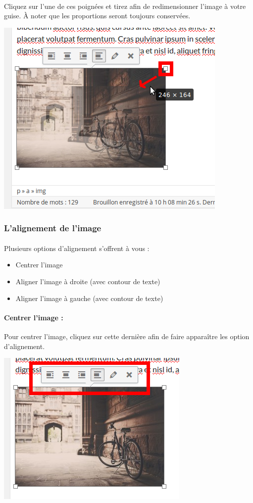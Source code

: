 \documentclass[10pt,a4paper]{article}
\begin{document}
\paragraph{}Cliquez sur l'une de ces poignées et tirez afin de redimensionner l'image à votre guise. À noter que les proportions seront toujours conservées.
\begin{center}
\includegraphics[scale=0.3]{img/0106.png}
\end{center}
\newpage
\subsubsection{L'alignement de l'image}
\paragraph{}Plusieurs options d'alignement s'offrent à vous :
\begin{itemize}
\item Centrer l'image
\item Aligner l'image à droite (avec contour de texte)
\item Aligner l'image à gauche (avec contour de texte)
\end{itemize}
\paragraph{Centrer l'image : }Pour centrer l'image, cliquez sur cette dernière afin de faire apparaître les option d'alignement.
\begin{center}
\includegraphics[scale=0.3]{img/0107.png}
\end{center}
\end{document}
